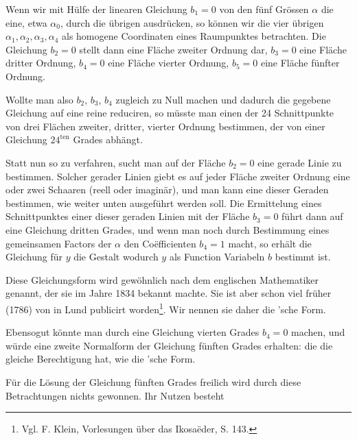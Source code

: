 
Wenn wir mit Hülfe der linearen Gleichung $b_1 = 0$ von
den fünf Grössen $\alpha$ die eine, etwa $\alpha_0$, durch die übrigen ausdrücken, so können wir die vier übrigen $\alpha_1, \alpha_2, \alpha_3, \alpha_4$ als homogene Coordinaten eines Raumpunktes betrachten. Die Gleichung
$b_2 = 0$ stellt dann eine Fläche zweiter Ordnung dar, $b_3 = 0$
eine Fläche dritter Ordnung, $b_4 = 0$ eine Fläche vierter Ordnung, $b_5 = 0$ eine Fläche fünfter Ordnung.

Wollte man also $b_2$, $b_3$, $b_4$ zugleich zu Null machen und
dadurch die gegebene Gleichung auf eine reine reduciren, so
müsste man einen der 24 Schnittpunkte von drei Flächen
zweiter, dritter, vierter Ordnung bestimmen, der von einer Gleichung $24^{\mathrm{ten}}$ Grades abhängt.

Statt nun so zu verfahren, sucht man auf der Fläche
$b_2 = 0$ eine gerade Linie zu bestimmen. Solcher gerader Linien
giebt es auf jeder Fläche zweiter Ordnung eine oder zwei
Schaaren (reell oder imaginär), und man kann eine dieser Geraden
 bestimmen, wie weiter unten ausgeführt werden soll. Die Ermittelung eines Schnittpunktes einer
dieser geraden Linien mit der Fläche $b_3 = 0$ führt dann auf
eine Gleichung dritten Grades, und wenn man noch durch Bestimmung eines gemeinsamen Factors der $\alpha$ den Coëfficienten
$b_4 = 1$ macht, so erhält die Gleichung für $y$ die Gestalt
wodurch $y$ als Function  Variabeln $b$ bestimmt ist.

Diese Gleichungsform wird gewöhnlich nach dem englischen
Mathematiker  genannt, der sie im Jahre 1834 bekannt
machte. Sie ist aber schon viel früher (1786) von 
in Lund publicirt worden\footnote{Vgl. F. Klein, Vorlesungen über das Ikosaëder, S. 143.}. Wir nennen sie daher die 'sche Form.

Ebensogut könnte man durch eine Gleichung vierten Grades
$b_4 = 0$ machen, und würde eine zweite Normalform der Gleichung
fünften Grades erhalten:
die die gleiche Berechtigung hat, wie die 'sche
Form.

Für die Lösung der Gleichung fünften Grades freilich wird
durch diese Betrachtungen nichts gewonnen. Ihr Nutzen besteht
